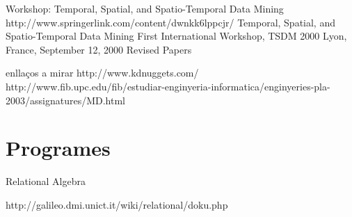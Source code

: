 Workshop: Temporal, Spatial, and Spatio-Temporal Data Mining
​http://www.springerlink.com/content/dwnkk6lppcjr/
Temporal, Spatial, and Spatio-Temporal Data Mining
First International Workshop, TSDM 2000 Lyon, France, September 12, 2000 Revised Papers


enllaços a mirar
​http://www.kdnuggets.com/
​http://www.fib.upc.edu/fib/estudiar-enginyeria-informatica/enginyeries-pla-2003/assignatures/MD.html



\section{Programes}

Relational Algebra

http://galileo.dmi.unict.it/wiki/relational/doku.php